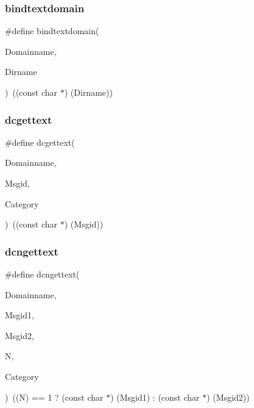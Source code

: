 \mbox{\label{gettext_8h_ac719c37e146c0e2030a7ed1dfcbdd5f8}} 
\subsubsection{bindtextdomain}
{\footnotesize\ttfamily \#define bindtextdomain(\begin{DoxyParamCaption}\item[{}]{Domainname,  }\item[{}]{Dirname }\end{DoxyParamCaption})~((const char $\ast$) (Dirname))}

\mbox{\label{gettext_8h_a4419bece30ab76327deb6ef4149322f4}} 
\subsubsection{dcgettext}
{\footnotesize\ttfamily \#define dcgettext(\begin{DoxyParamCaption}\item[{}]{Domainname,  }\item[{}]{Msgid,  }\item[{}]{Category }\end{DoxyParamCaption})~((const char $\ast$) (Msgid))}

\mbox{\label{gettext_8h_aa646ec380c28849655fcc4d56873062c}} 
\subsubsection{dcngettext}
{\footnotesize\ttfamily \#define dcngettext(\begin{DoxyParamCaption}\item[{}]{Domainname,  }\item[{}]{Msgid1,  }\item[{}]{Msgid2,  }\item[{}]{N,  }\item[{}]{Category }\end{DoxyParamCaption})~((N) == 1 ? (const char $\ast$) (Msgid1) \+: (const char $\ast$) (Msgid2))}

\mbox{\label{gettext_8h_a86f757e66ffde703afba316a7396a28f}} 
